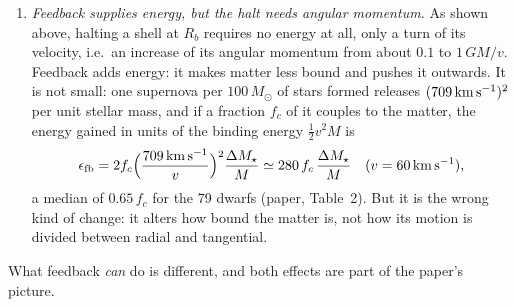 \documentclass[11pt,a4paper]{article}
\begin{document}
\begin{enumerate}
  (paper, Sect.~5.4), so a shell's energy changes by at most about $0.02\,v^2$ per
  such event, against the $\tfrac12v^2$ of radial motion that has to be turned into
  tangential motion. Even if all the cosmic baryons, $f=0.16$, were blown out at once,
  the change would be $0.16\,v^2$, and it would still be an energy change: a
  spherically symmetric outflow exerts no torque, so the shell's angular momentum, and
  hence its pericentre at $R_b/28$, would stay the same.
\item \emph{Feedback supplies energy, but the halt needs angular momentum.} As shown
  above, halting a shell at $R_b$ requires no energy at all, only a turn of its
  velocity, i.e.\ an increase of its angular momentum from about $0.1$ to
  $1\,GM/v$. Feedback adds energy: it makes matter less bound and pushes it outwards.
  It is not small: one supernova per $100\,M_\odot$ of stars formed releases
  $(709\,{\rm km\,s^{-1}})^2$ per unit stellar mass, and if a fraction $f_c$ of it
  couples to the matter, the energy gained in units of the binding energy
  $\tfrac12v^2M$ is
  \begin{equation*}
    \epsilon_{\rm fb}=2f_c\Bigl(\frac{709\,{\rm km\,s^{-1}}}{v}\Bigr)^2
    \frac{\Delta M_\star}{M}\simeq280\,f_c\,\frac{\Delta M_\star}{M}
    \quad(v=60\,{\rm km\,s^{-1}}),
  \end{equation*}
  a median of $0.65\,f_c$ for the 79 dwarfs (paper, Table~2). But it is the wrong
  kind of change: it alters how bound the matter is, not how its motion is divided
  between radial and tangential.
\end{enumerate}
What feedback \emph{can} do is different, and both effects are part of the paper's
picture.
\end{document}
